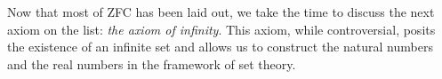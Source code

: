 Now that most of ZFC has been laid out, we take the time to discuss the
next axiom on the list:
\textit{the axiom of infinity}. This axiom,
while controversial, posits the existence of an infinite set and allows
us to construct the natural numbers and the real numbers in the
framework of set theory.